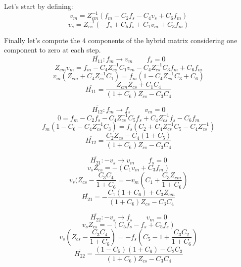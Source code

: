 \documentclass[a4paper,12pt]{article}
\begin{document}
\noindent Let's start by defining:
\begin{equation}
    v_m = Z_{cm}^{-1}(f_m -C_2f_s-C_4v_s+C_6f_m)
\end{equation}
\begin{equation}
    v_s = Z_{cs}^{-1}(-f_s +C_5f_s+C_1v_m+C_3f_m)
\end{equation}

\noindent Finally let's compute the 4 components of the hybrid matrix considering one component to zero at each step.
\[
    \overline{H_{11}} : f_m \rightarrow v_m \qquad f_s = 0
    \]\[
    Z_{cm}v_m = f_m - C_4Z_{cs}^{-1}C_1v_m - C_4Z_{cs}^{-1}C_3f_m + C_6f_m
\]\[
    v_m(Z_{cm}+C_4Z_{cs}^{-1}C_1) = f_m(1-C_4Z_{cs}^{-1}C_3 + C_6)
    \]\[
    \overline{H_{11}} = \frac{Z_{cm}Z_{cs}+C_1C_4}{(1+C_6)Z_{cs} - C_3C_4}
\]


\bigskip

\[
    \overline{H_{12}} : f_m \rightarrow f_s \qquad v_m = 0
    \]\[
    0 = f_m -C_2f_s -C_4Z_{cs}^{-1}C_5f_s + C_4Z_{cs}^{-1}f_s - C_6f_m
\]\[
    f_m(1-C_6-C_4Z_{cs}^{-1}C_3) = f_s(C_2+C_4Z_{cs}^{-1}C_5-C_4Z_{cs}^{-1})
    \]\[
    \overline{H_{12}} = \frac{C_2Z_{cs}-C_4(1+C_5)}{(1+C_6)Z_{cs} - C_3C_4}
\]

\bigskip

\[
    \overline{H_{21}} : -v_s \rightarrow v_m \qquad f_s = 0
    \]\[
    v_sZ_{cs} = -(C_1v_m + C_3f_m)
\]\[
    v_s(Z_{cs} - \frac{C_3C_4}{1+C_6} = -v_m(C_1 + \frac{C_3Z_{cm}}{1+C_6})
    \]\[
    \overline{H_{21}} = -\frac{C_1(1+C_6) + C_3Z_{cm}}{(1+C_6)Z_{cs} - C_3C_4}
\]


\bigskip

\[
    \overline{H_{22}} : -v_s \rightarrow f_s \qquad v_m = 0
\]\[
    v_sZ_{cs} = -(C_5f_s - f_s +C_5f_s)
\]\[
    v_s(Z_{cs}-\frac{C_3C_4}{1+C_6}) = -f_s(C_5 - 1 + \frac{C_3C_2}{1+C_6})
\]\[
    \overline{H_{22}} = \frac{(1-C_5)(1+C_6)-C_2C_3}{(1+C_6)Z_{cs}-C_3C_4}
\]
\end{document}
